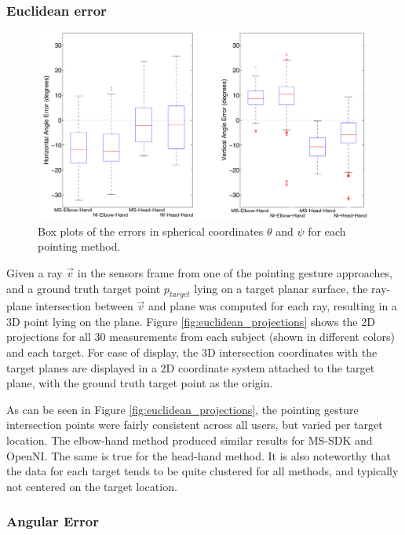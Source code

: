 \documentclass[12pt]{gatech-thesis}
\begin{document}
\subsubsection{Euclidean error}
\label{sec:pointing_euclidean_error}

\begin{figure}[ht!]%
\centering
\includegraphics[width=1.0\textwidth]{pics/boxplots_largerfont}
\caption{Box plots of the errors in spherical coordinates $\theta$ and $\psi$ for each pointing method.}
\label{fig:pointing_angular_boxplots}
\end{figure}

Given a ray $\vec{v}$ in the sensors frame from one of the pointing gesture approaches, and a ground truth target point $p_{target}$ lying on a target planar surface, the ray-plane intersection between $\vec{v}$ and plane was computed for each ray, resulting in a 3D point lying on the plane. Figure \ref{fig:euclidean_projections} shows the 2D projections for all 30 measurements from each subject (shown in different colors) and each target. For ease of display, the 3D intersection coordinates with the target planes are displayed in a 2D coordinate system attached to the target plane, with the ground truth target point as the origin.  

As can be seen in Figure \ref{fig:euclidean_projections},  the pointing gesture intersection points were fairly consistent across all users, but varied per target location.  The elbow-hand method produced similar results for MS-SDK and OpenNI. The same is true for the head-hand method.  It is also noteworthy that the data for each target tends to be quite clustered for all methods, and typically not centered on the target location.

\subsubsection{Angular Error}
\label{sec:pointing_angular_error}
\end{document}
